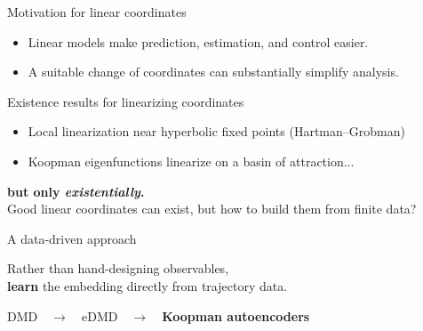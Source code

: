 \documentclass[aspectratio=169,10pt]{beamer}
\newcommand{\emphp}[1]{{\color{skaepurple}\bfseries #1}}
\newcommand{\statement}[1]{\vfill\begin{center}\Large\color{skaeink}#1\end{center}\vfill}
\newenvironment{points}{\large\begin{itemize}\setlength{\itemsep}{0.85em}}{\end{itemize}}
\begin{document}
\begin{frame}{Motivation for linear coordinates}
  \vfill
  \begin{points}
    \item Linear models make prediction, estimation, and control easier.
    \item A suitable change of coordinates can substantially simplify analysis.
  \end{points}
  \vfill
\end{frame}

\begin{frame}{Existence results for linearizing coordinates}
  \begin{points}
    \item Local linearization near hyperbolic fixed points (Hartman--Grobman)
    \item Koopman eigenfunctions linearize on a basin of attraction...
  \end{points}
  \begin{center}
  {\Large\color{skaeink}\bfseries but only \emph{existentially}.}\\[0.4em]
  {\large\color{skaeink} Good linear coordinates can exist, but how to build them from finite data?}
  \end{center}
\end{frame}

\begin{frame}{A data-driven approach}
  \statement{Rather than hand-designing observables,\\ \emphp{learn} the embedding directly from trajectory data.}
  \begin{center}
    \large DMD\ \ $\to$\ \ eDMD\ \ $\to$\ \ \emphp{Koopman autoencoders}
  \end{center}
  \vfill
\end{frame}
\end{document}
